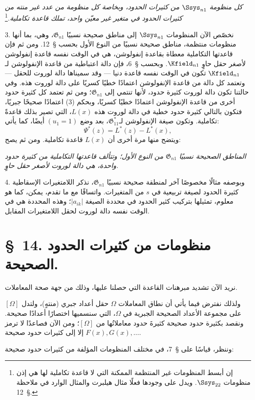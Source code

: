 \documentclass[11pt]{article}
\newcommand{\srcLTR}[1]{\relax\ifmmode\text{\mbox{\babelsublr{\foreignlanguage{english}{#1}}}}\else\babelsublr{\foreignlanguage{english}{#1}}\fi}
\newcommand{\srcfn}[2]{\begingroup\renewcommand{\thefootnote}{\srcLTR{#1}}\footnote{#2}\addtocounter{footnote}{-1}\endgroup}
\providecommand{\Gdom}{\mathfrak{G}}
\begin{document}
\emph{كل منظومة $\Ssys_{n1}$ من كثيرات الحدود، وبخاصة كل منظومة من عدد غير منته من كثيرات الحدود في متغير غير معيّن واحد، تملك قاعدة تكاملية.}\srcfn{**)}{إن أبسط المنظومات غير المنتظمة الممكنة التي لا قاعدة تكاملية لها هي إذن منظومات $\Ssys_{22}$. ويدل على وجودها فعلًا مثال هيلبرت والمثال الوارد في ملاحظة \S\ 12.}

3. نخصّص الآن المنظومات $\Ssys_{n1}$ إلى مناطق صحيحة نسبيًا $\Gdom_{n1}$، وهي، بما أنها منظومات منتظمة، مناطق صحيحة نسبيًا من النوع الأول بحسب \S\ 12. ومن ثم فإن قاعدتها التكاملية معطاة بقاعدة إنفولوشن، هي في الوقت نفسه قاعدة إنفولوشن لأصغر حقل حاوٍ $\Kfield_{n1}$. وبحسب \S\ 6، فإن دالة اعتباطية من قاعدة الإنفولوشن لـ$\Kfield_{n1}$ تكون في الوقت نفسه قاعدة دنيا --- وقد سميناها دالة لوروت للحقل --- وتعتمد كل دالة من قاعدة الإنفولوشن اعتمادًا خطيًا كسريًا على دالة لوروت هذه. وفي حالتنا تكون دالة لوروت كثيرة حدود، لأنها تنتمي إلى $\Gdom_{n1}$؛ ومن ثم تعتمد كل كثيرة حدود أخرى من قاعدة الإنفولوشن اعتمادًا خطيًا كسريًا، وبحكم (3) اعتمادًا صحيحًا جبريًا، فتكون بالتالي كثيرة حدود خطية في دالة لوروت هذه $L(x)$، التي تصير بذلك قاعدةً تكاملية. وتكون صيغة الإنفولوشن لـ$\Gdom^*_{11}$، بعد وضع $(u_1=1)$ أيضًا، كما يأتي:
\[
  \Psi^*(z)=L^*(z)-L^*(x),
\]
ويتضح منها مرة أخرى أن $L(x)$ قاعدة تكاملية. ومن ثم يصح:

\emph{المناطق الصحيحة نسبيًا $\Gdom_{n1}$ من النوع الأول؛ وتتألف قاعدتها التكاملية من كثيرة حدود واحدة، هي دالة لوروت لأصغر حقل حاوٍ.}

4. وبوصفه مثالًا مخصوصًا آخر لمنطقة صحيحة نسبيًا $\Gdom_{n1}$، نذكر اللامتغيرات الإسقاطية كثيرة الحدود لصيغة تربيعية في $s$ من المتغيرات. واتساقًا مع ما تقدم، يمكن، كما هو معلوم، تمثيلها بتركيب كثير الحدود في محددة الصيغة $|a_{ik}|$؛ وهذه المحددة هي في الوقت نفسه دالة لوروت لحقل اللامتغيرات المقابل.

\section*{\S\ 14. منظومات من كثيرات الحدود الصحيحة.}

نريد الآن تشديد مبرهنات القاعدة التي حصلنا عليها، وذلك من جهة صحة المعاملات.

ولذلك نفترض فيما يأتي أن نطاق المعاملات $\Omega$ حقل أعداد جبري (منتهٍ)، ولتدل $[\Omega]$ على مجموعة الأعداد الصحيحة الجبرية في $\Omega$، التي سنسميها اختصارًا أعدادًا صحيحة. ونقصد بكثيرة حدود صحيحة كثيرةَ حدود معاملاتُها من $[\Omega]$؛ ومن الآن فصاعدًا لا ترمز $F(x),G(x),\ldots$ إلا إلى كثيرات حدود صحيحة.

وننظر، قياسًا على \S\ 7، في مختلف المنظومات المؤلفة من كثيرات حدود صحيحة:
\end{document}
